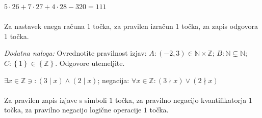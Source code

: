 \documentclass[addpoints]{exam}
\begin{document}
\begin{questions}
    \begin{solution}[4cm]
        $5\cdot 26+7\cdot 27+4\cdot 28-320=111$ \\ \\
        Za nastavek enega računa $1$ točka, za pravilen izračun $1$ točka, za zapis odgovora $1$ točka.
    \end{solution}


\newpage

    \vspace{0.1in}

    \bonusquestion[3]
    \textit{Dodatna naloga:} Ovrednotite pravilnost izjav: $A: (-2,3)\in\mathbb{N}\times\mathbb{Z}$; $B:\mathbb{N}\subsetneq\mathbb{N}$; $C: \left\{1\right\}\in\left\{\mathbb{Z}\right\}$. Odgovore utemeljite.
    \begin{solution}
        $\exists x\in\mathbb{Z}\ni:(3\mid x)\land(2\mid x)$; negacija: $\forall x\in\mathbb{Z}: (3\nmid x)\lor(2\nmid x)$ \\ \\
        Za pravilen zapis izjave s simboli $1$ točka, za pravilno negacijo kvantifikatorja $1$ točka, za pravilno negacijo logične operacije $1$ točka.
    \end{solution}

\end{questions}
\end{document}
